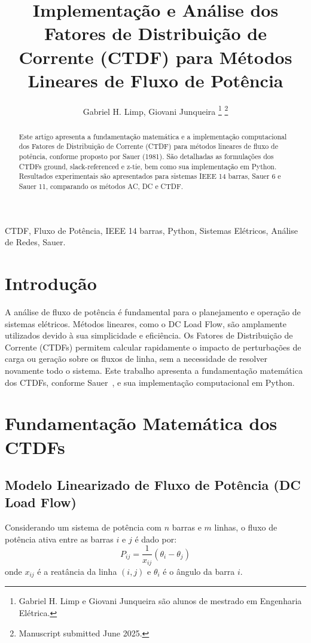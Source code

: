 \documentclass[journal]{IEEEtran}
\begin{document}
\title{Implementação e Análise dos Fatores de Distribuição de Corrente (CTDF) para Métodos Lineares de Fluxo de Potência}

\author{Gabriel H. Limp, Giovani Junqueira
\thanks{Gabriel H. Limp e Giovani Junqueira são alunos de mestrado em Engenharia Elétrica.}
\thanks{Manuscript submitted June 2025.}
}

\maketitle

\begin{abstract}
Este artigo apresenta a fundamentação matemática e a implementação computacional dos Fatores de Distribuição de Corrente (CTDF) para métodos lineares de fluxo de potência, conforme proposto por Sauer (1981). São detalhadas as formulações dos CTDFs ground, slack-referenced e z-tie, bem como sua implementação em Python. Resultados experimentais são apresentados para sistemas IEEE 14 barras, Sauer 6 e Sauer 11, comparando os métodos AC, DC e CTDF.
\end{abstract}

\begin{IEEEkeywords}
CTDF, Fluxo de Potência, IEEE 14 barras, Python, Sistemas Elétricos, Análise de Redes, Sauer.
\end{IEEEkeywords}

\section{Introdução}
A análise de fluxo de potência é fundamental para o planejamento e operação de sistemas elétricos. Métodos lineares, como o DC Load Flow, são amplamente utilizados devido à sua simplicidade e eficiência. Os Fatores de Distribuição de Corrente (CTDFs) permitem calcular rapidamente o impacto de perturbações de carga ou geração sobre os fluxos de linha, sem a necessidade de resolver novamente todo o sistema. Este trabalho apresenta a fundamentação matemática dos CTDFs, conforme Sauer~\cite{Sauer1981}, e sua implementação computacional em Python.

\section{Fundamentação Matemática dos CTDFs}

\subsection{Modelo Linearizado de Fluxo de Potência (DC Load Flow)}
Considerando um sistema de potência com $n$ barras e $m$ linhas, o fluxo de potência ativa entre as barras $i$ e $j$ é dado por:
\begin{equation}
    P_{ij} = \frac{1}{x_{ij}} (\theta_i - \theta_j)
\end{equation}
onde $x_{ij}$ é a reatância da linha $(i,j)$ e $\theta_i$ é o ângulo da barra $i$.
\end{document}
